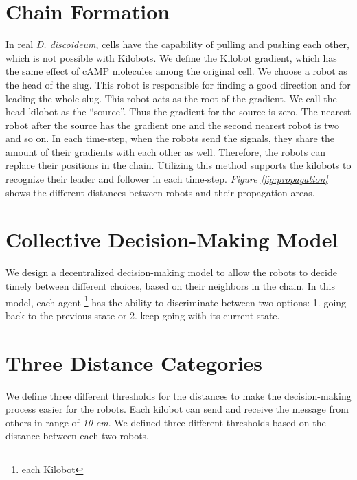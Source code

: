 \documentclass[11pt,a4paper]{article}
\begin{document}
\section {Chain Formation} 
In real \textit{D. discoideum}, cells have the capability of pulling and pushing each other, which is not possible with Kilobots. We define the Kilobot gradient, which has the same effect of cAMP molecules among the original cell. We choose a robot as the head of the slug. This robot is responsible for finding a good direction and for leading the whole slug. This robot acts as the root of the gradient. We call the head kilobot as the ``source''. Thus the gradient for the source is zero. The nearest robot after the source has the gradient one and the second nearest robot is two and so on. In each time-step, when the robots send the signals, they share the amount of their gradients with each other as well. Therefore, the robots can replace their positions in the chain. Utilizing this method supports the kilobots to recognize their leader and follower in each time-step. \textit{Figure \ref{fig:propagation}} shows the different distances between robots and their propagation areas. 


\section{Collective Decision-Making Model}
We design a decentralized decision-making model to allow the robots to decide timely between different choices, based on their neighbors in the chain. In this model, each agent \footnote{each Kilobot} has the ability to discriminate between two options: 1. going back to the previous-state or 2. keep going with its current-state. 

\section{Three Distance Categories}
We define three different thresholds for the distances to make the decision-making process easier for the robots. Each kilobot can send and receive the message from others in range of \textit{10 cm}. We defined three different thresholds based on the distance between each two robots. 
\end{document}
